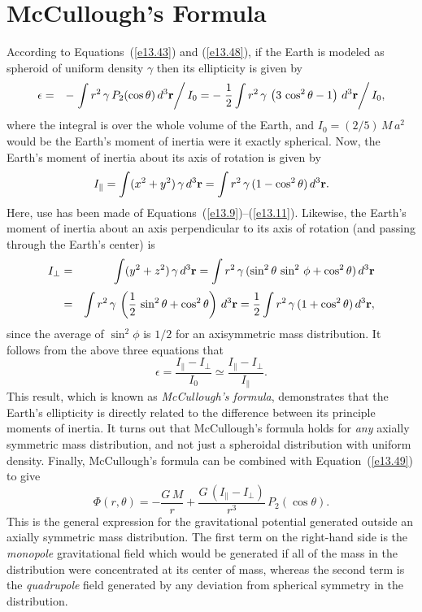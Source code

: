 \section{McCullough's Formula}\label{smcl}
According to Equations~(\ref{e13.43}) and (\ref{e13.48}), if the Earth
is modeled as spheroid of uniform density $\gamma$ then its ellipticity
is given by
\begin{eqnarray}
\epsilon& =& - \left.\int r^2\,\gamma\,P_2(\cos\theta)\,d^{3}{\bf r}\right/ I_0
= - \left.\frac{1}{2}\int r^2\,\gamma\,\left(3\,\cos^2\theta - 1\right)\,d^{3}{\bf r}\right/ I_0,
\end{eqnarray}
where the integral is over the whole volume of the Earth, and
$I_0 = (2/5)\,M\,a^2$ would be the Earth's moment of inertia  were it
exactly spherical. Now, the Earth's moment of inertia about its
axis of rotation is given by
\begin{equation}
I_\parallel = \int (x^2+y^2)\,\gamma\,d^3{\bf r} = \int r^2\,\gamma\,(1-\cos^2\theta)\,d^3{\bf r}.
\end{equation}
Here, use has been made of Equations~(\ref{e13.9})--(\ref{e13.11}). Likewise,
the Earth's moment of inertia about an axis perpendicular to its
axis of rotation (and passing through the Earth's center) is
\begin{eqnarray}
I_\perp&= &\int (y^2+z^2)\,\gamma\,d^3{\bf r} = \int r^2\,\gamma\,(\sin^2\theta\,\sin^2\,\phi + \cos^2\theta)\,d^3{\bf r}\nonumber\\[0.5ex]
&=& \int r^2\,\gamma\,\left(\frac{1}{2}\,\sin^2\theta+ \cos^2\theta\right)\,d^3{\bf r} = \frac{1}{2}\int r^2\,\gamma\,(1+ \cos^2\theta)\,d^3{\bf r},
\end{eqnarray}
since the average of $\sin^2\phi$ is $1/2$ for an axisymmetric mass distribution. It follows from the above three equations that
\begin{equation}\label{emcll}
\epsilon = \frac{I_\parallel-I_\perp}{I_0}\simeq \frac{I_\parallel-I_\perp
}{I_\parallel}.
\end{equation}
This result, which is known as {\em McCullough's formula}, demonstrates
that the Earth's ellipticity is directly related to the difference between
its principle moments of inertia. It turns out that McCullough's formula
holds for {\em any}\/ axially symmetric mass distribution, and not
just a spheroidal distribution with uniform density. Finally, McCullough's
formula can be combined with Equation~(\ref{e13.49}) to give
\begin{equation}\label{e13.66a}
\Phi(r,\theta) = - \frac{G\,M}{r} + \frac{G\,(I_\parallel - I_\perp)}{r^3}\,P_2(\cos\theta).
\end{equation}
This is the general expression for the gravitational potential generated outside
an axially symmetric mass distribution. The first term on the right-hand
side is the {\em monopole}\/ gravitational field which would be generated
if all  of the mass in the distribution were concentrated at its center of mass,
whereas the second term is the {\em quadrupole}\/ field generated by any deviation from spherical symmetry in the distribution.

